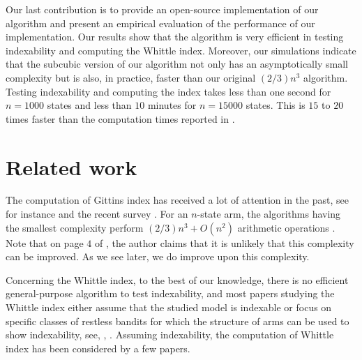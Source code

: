 Our last contribution is to provide an open-source implementation of our algorithm and present an empirical evaluation of the performance of our implementation. Our results show that the algorithm is very efficient in testing indexability and computing the Whittle index. Moreover, our simulations indicate that the subcubic version of our algorithm not only has an asymptotically small complexity but is also, in practice, faster than our original $(2/3)n^3$ algorithm. Testing indexability and computing the index takes less than one second for $n=1000$ states and less than $10$ minutes for $n=15000$ states. This is $15$ to $20$ times faster than the computation times reported in \cite{nino2020fast}.

\section{Related work}
\label{ch:cpt:sec:related}

The computation of Gittins index has received a lot of attention in the past, see for instance \cite{chen1986linear, katehakis1987multi, nino20072, sonin2008generalized} and the recent survey \cite{chakravorty2014multi}.
For an $n$-state arm, the algorithms having the smallest complexity perform $(2/3)n^3+O(n^2)$ arithmetic operations \cite{chakravorty2014multi}.
Note that on page $4$ of \cite{nino2020fast}, the author claims that it is unlikely that this complexity can be improved.
As we see later, we do improve upon this complexity. 

Concerning the Whittle index, to the best of our knowledge, there is no efficient general-purpose algorithm to test indexability, and most papers studying the Whittle index either assume that the studied model is indexable or focus on specific classes of restless bandits for which the structure of arms can be used to show indexability, see, \ie, \cite{aalto2011properties,akbarzadeh2019restless,akbarzadeh2021maintenance,borkar2017whittle}.
Assuming indexability, the computation of Whittle index has been considered by a few papers.

